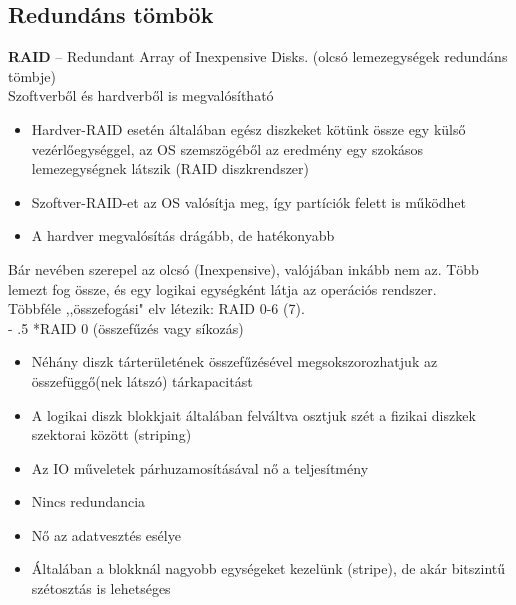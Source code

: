 \documentclass[tikz,12pt,margin=0px]{article}
\makeatletter
\renewcommand\paragraph{%
	\@startsection{paragraph}{4}{0mm}%
	{-\baselineskip}%
	{.5\baselineskip}%
	{\normalfont\normalsize\bfseries}}
\makeatother
\begin{document}
	\subsection*{Redundáns tömbök}
	
    \textbf{RAID} -- Redundant Array of Inexpensive Disks. (olcsó lemezegységek redundáns tömbje)\\

    \noindent Szoftverből és hardverből is megvalósítható
    \begin{itemize}[topsep=8pt,itemsep=4pt,partopsep=4pt, parsep=4pt]
        \item Hardver-RAID esetén általában egész diszkeket kötünk össze egy külső vezérlőegységgel, az OS szemszögéből az eredmény egy szokásos lemezegységnek látszik (RAID diszkrendszer)
        \item Szoftver-RAID-et az OS valósítja meg, így partíciók felett is működhet
        \item A hardver megvalósítás drágább, de hatékonyabb
    \end{itemize}

    \noindent Bár nevében szerepel az olcsó (Inexpensive), valójában inkább nem az. Több lemezt fog össze, és egy logikai egységként látja az operációs rendszer.\\
    Többféle ,,összefogási" elv létezik: RAID 0-6 (7).\\

	\paragraph*{RAID 0 (összefűzés vagy síkozás)}

    \begin{itemize}[topsep=8pt,itemsep=4pt,partopsep=4pt, parsep=4pt]
        \item Néhány diszk tárterületének összefűzésével megsokszorozhatjuk az összefüggő(nek látszó) tárkapacitást
        \item A logikai diszk blokkjait általában felváltva osztjuk szét a fizikai diszkek szektorai között (striping)
        \item Az IO műveletek párhuzamosításával nő a teljesítmény
        \item Nincs redundancia
        \item Nő az adatvesztés esélye
        \item Általában a blokknál nagyobb egységeket kezelünk (stripe), de akár bitszintű szétosztás is lehetséges
    \end{itemize}
\end{document}
